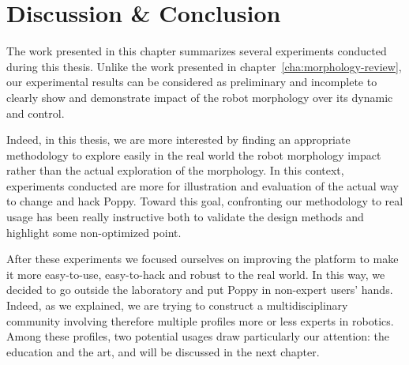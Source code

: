

% 



\section{Discussion \& Conclusion } %

The work presented in this chapter summarizes several experiments conducted during this thesis.
Unlike the work presented in chapter~\ref{cha:morphology-review}, our experimental results can be considered as preliminary and incomplete to clearly show and demonstrate impact of the robot morphology over its dynamic and control.

Indeed, in this thesis, we are more interested by finding an appropriate methodology to explore easily in the real world the robot morphology impact rather than the actual exploration of the morphology. In this context, experiments conducted are more for illustration and evaluation of the actual way to change and hack Poppy. Toward this goal, confronting our methodology to real usage has been really instructive both to validate the design methods and highlight some non-optimized point.

After these experiments we focused ourselves on improving the platform to make it more easy-to-use, easy-to-hack and robust to the real world. In this way, we decided to go outside the laboratory and put Poppy in non-expert users' hands. Indeed, as we explained, we are trying to construct a multidisciplinary community involving therefore multiple profiles more or less experts in robotics. Among these profiles, two potential usages draw particularly our attention: the education and the art, and will be discussed in the next chapter.


